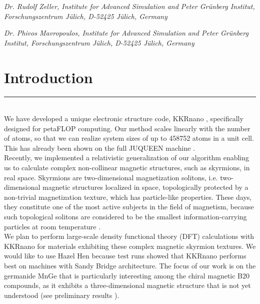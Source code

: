 \documentclass [a4paper, 12pt]{article}
\begin{document}
\phantom{MM} \textit{Dr. Rudolf Zeller,
Institute for Advanced Simulation and Peter Gr\"unberg Institut, Forschungszentrum J\"ulich, D-52425 J\"ulich, Germany
}

\phantom{MM} \textit{Dr. Phivos Mavropoulos,
Institute for Advanced Simulation and Peter Gr\"unberg Institut, Forschungszentrum J\"ulich, D-52425 J\"ulich, Germany
}



\newpage

\vfill
\tableofcontents
\vfill

\newpage



\section{Introduction}
\rule{\textwidth}{0.4pt}\\


We have developed a unique electronic structure code, 
KKRnano \cite{zeller_towards_2008,thiess_massively_2012},
specifically designed for petaFLOP computing. Our method scales linearly
with the number of atoms, so that we can realize system sizes of up to 
458752 atoms in a unit cell. This has already been shown on the full JUQUEEN
machine \cite{brommel_juqueen_2017}.
\\
Recently, we implemented a relativistic generalization of our algorithm 
enabling us to calculate complex non-collinear magnetic structures, such as skyrmions,
in real space. Skyrmions are two-dimensional magnetization solitons, i.e. two-dimensional
magnetic structures localized in space, topologically protected by a non-trivial
magnetization texture, which has particle-like properties. 
These days, they constitute one of the most active subjects in the field of 
magnetism, because such topological solitons are considered to be the smallest 
information-carrying particles at room temperature \cite{fert_skyrmions_2013,castelvecchi_strange_2017}. 
\\
We plan to perform large-scale density functional theory (DFT) calculations with 
KKRnano for materials exhibiting these complex magnetic skyrmion textures. We would like to use Hazel Hen
because test runs showed that KKRnano performs best on machines with Sandy Bridge
architecture.
The focus of our work is on the germanide MnGe that is particularly
interesting among the chiral magnetic B20 compounds, as it exhibits a three-dimensional magnetic structure
that is not yet understood (see preliminary results
\cite{tanigaki_real-space_2015,rybakov_new_2016,bornemann_investigation_2017}).
\end{document}
